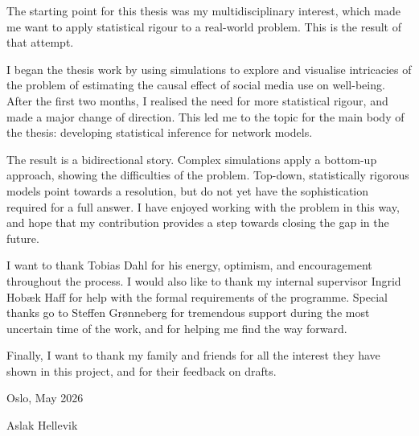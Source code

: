 \begin{preface}

The starting point for this thesis was my multidisciplinary interest, which made me want to apply statistical rigour to a real-world problem. This is the result of that attempt.

I began the thesis work by using simulations to explore and visualise intricacies of the problem of estimating the causal effect of social media use on well-being. After the first two months, I realised the need for more statistical rigour, and made a major change of direction. This led me to the topic for the main body of the thesis: developing statistical inference for network models.

The result is a bidirectional story. Complex simulations apply a bottom-up approach, showing the difficulties of the problem. Top-down, statistically rigorous models point towards a resolution, but do not yet have the sophistication required for a full answer. I have enjoyed working with the problem in this way, and hope that my contribution provides a step towards closing the gap in the future.

I want to thank Tobias Dahl for his energy, optimism, and encouragement throughout the process. I would also like to thank my internal supervisor Ingrid Hobæk Haff for help with the formal requirements of the programme. Special thanks go to Steffen Grønneberg for tremendous support during the most uncertain time of the work, and for helping me find the way forward.

Finally, I want to thank my family and friends for all the interest they have shown in this project, and for their feedback on drafts.

\vspace{3cm}
\noindent Oslo, May 2026

\vspace{1cm}
\noindent Aslak Hellevik

\end{preface}
